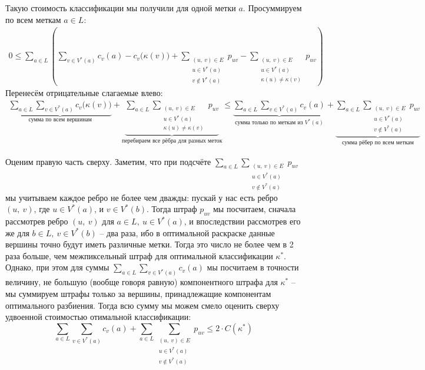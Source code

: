 \documentclass[a4paper,12pt]{article}
\begin{document}
Такую стоимость классификации мы получили для одной метки $a$. Просуммируем по всем меткам $a \in L$:
\begin{gather*}
    0 \leqslant \sum\limits_{a \in L} \left(\sum\limits_{v \in V^*(a)}c_v(a) - c_v\big(\kappa(v)\big) + \displaystyle\sum\limits_{\substack{(u,\ v)\in E\\u \in V^*(a)\\ v \notin V^*(a)}}p_{uv} -\displaystyle\sum\limits_{\substack{(u,\ v)\in E\\u \in V^*(a)\\ \kappa(u)\neq \kappa(v)}}p_{uv}\right)
\end{gather*}
Перенесём отрицательные слагаемые влево:
\begin{gather*}
     \underbrace{\sum\limits_{a \in L}\sum\limits_{v \in V^*(a)}c_v\big(\kappa(v)\big)}_{\text{сумма по всем вершинам}} + \underbrace{\sum\limits_{a \in L}\displaystyle\sum\limits_{\substack{(u,\ v)\in E\\u \in V^*(a)\\ \kappa(u)\neq \kappa(v)}}p_{uv}}_{\text{перебираем все рёбра для разных меток}} \leqslant \underbrace{\sum\limits_{a \in L} \sum\limits_{v \in V^*(a)}c_v(a)}_{\text{сумма только по меткам из $V^*(a)$}} + \underbrace{\sum\limits_{a \in L}\displaystyle\sum\limits_{\substack{(u,\ v)\in E\\u \in V^*(a)\\ v \notin V^*(a)}}p_{uv}}_{\text{сумма рёбер по всем меткам}}
\end{gather*}

Оценим правую часть сверху. Заметим, что при подсчёте $\displaystyle\sum\limits_{a \in L}\displaystyle\sum\limits_{\substack{(u,\ v)\in E\\u \in V^*(a)\\ v \notin V^*(a)}}p_{uv}$ мы учитываем каждое ребро не более чем дважды: пускай у нас есть ребро $(u,\ v)$, где $u \in V^*(a)$, и $v \in V^*(b)$. Тогда штраф $p_{uv}$ мы посчитаем, сначала рассмотрев ребро $(u,\ v)$ для $a \in L,\ u \in V^*(a)$, и впоследствии рассмотрев его же для $b \in L,\ v \in V^*(b)$ -- два раза, ибо в оптимальной раскраске данные вершины точно будут иметь различные метки. Тогда это число не более чем в 2 раза больше, чем межпиксельный штраф для оптимальной классификации $\kappa^*$. Однако, при этом для суммы $\displaystyle\sum\limits_{a \in L} \sum\limits_{v \in V^*(a)}c_v(a)$ мы посчитаем в точности величину, не большую (вообще говоря равную) компонентного штрафа для $\kappa^*$ -- мы суммируем штрафы только за вершины, принадлежащие компонентам оптимального разбиения. Тогда всю сумму мы можем смело оценить сверху удвоенной стоимостью отимальной классификации:
\[\sum\limits_{a \in L} \sum\limits_{v \in V^*(a)}c_v(a) + \sum\limits_{a \in L}\displaystyle\sum\limits_{\substack{(u,\ v)\in E\\u \in V^*(a)\\ v \notin V^*(a)}}p_{uv} \leqslant 2 \cdot C(\kappa^*)\]
\end{document}
